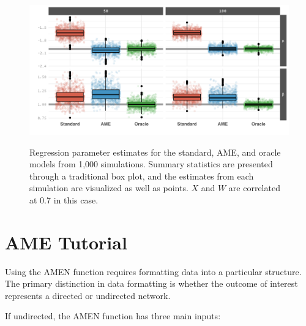 \begin{figure}[ht]
\caption{Regression parameter estimates for the standard, AME, and oracle models from 1,000 simulations. Summary statistics are presented through a traditional box plot, and the estimates from each simulation are visualized as well as points. $X$ and $W$ are correlated at 0.7 in this case.}
\label{fig:ameBias_corrHi}
\includegraphics[width=1\textwidth]{graphics/ameSimBias_all_corrProbitHi.pdf} \\
\end{figure}

\FloatBarrier
\clearpage

\section{AME Tutorial}

Using the AMEN function requires formatting data into a particular structure. The primary distinction in data formatting is whether the outcome of interest represents a directed or undirected network.

If undirected, the AMEN function has three main inputs:

